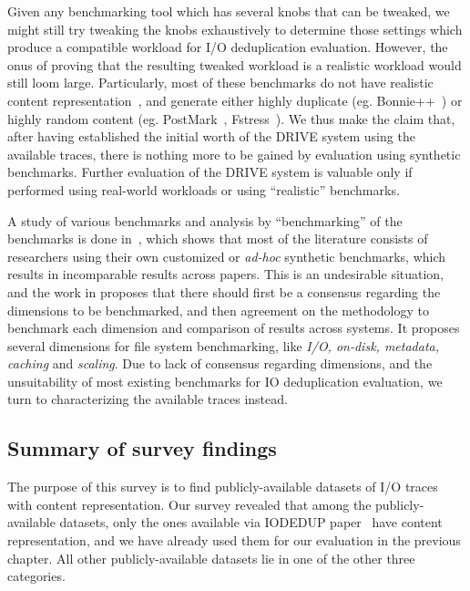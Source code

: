 Given any benchmarking tool which has several knobs that can be tweaked,
we might still try tweaking the knobs exhaustively to determine those
settings which produce a compatible workload for 
I/O deduplication evaluation.
However, the onus of proving that the resulting tweaked workload is a 
realistic workload would still loom large. 
Particularly, most of these benchmarks
do not have realistic content representation~\cite{dedis}, 
and generate either highly duplicate (eg. Bonnie++~\cite{bonnie}) 
or highly random content (eg. 
PostMark~\cite{postmark}, Fstress~\cite{fstress}).
We thus make the claim that,
after having established the initial worth of the DRIVE system using
the available traces, there is nothing more to be gained by evaluation
using synthetic benchmarks. 
Further evaluation of the DRIVE system is
valuable only if performed using real-world workloads 
or using ``realistic'' benchmarks.

A study of various benchmarks and analysis by ``benchmarking'' of the
benchmarks is done in~\cite{rocket-science}, which shows that most of
the literature consists of researchers using their own customized
or \textit{ad-hoc}
synthetic benchmarks, which results in incomparable results across
papers. This is an undesirable situation, 
and the work in \cite{rocket-science}
proposes that there should first be a consensus regarding the
dimensions to be benchmarked, and then agreement on the methodology
to benchmark each dimension and comparison of results across systems.
It proposes several dimensions for file system benchmarking, like 
\textit{I/O, on-disk, metadata, caching} and \textit{scaling}.
Due to lack of consensus regarding dimensions, and
the unsuitability of most existing benchmarks for IO deduplication
evaluation, we turn to characterizing the available traces instead.




\subsection{Summary of survey findings}
The purpose of this survey is to find publicly-available datasets
of I/O traces with content representation. Our survey revealed that
among the publicly-available datasets, only the ones available 
via IODEDUP paper~\cite{iodedup} have content representation,
and we have already used them for our evaluation in the previous
chapter. All other publicly-available datasets lie in one of
the other three categories.

